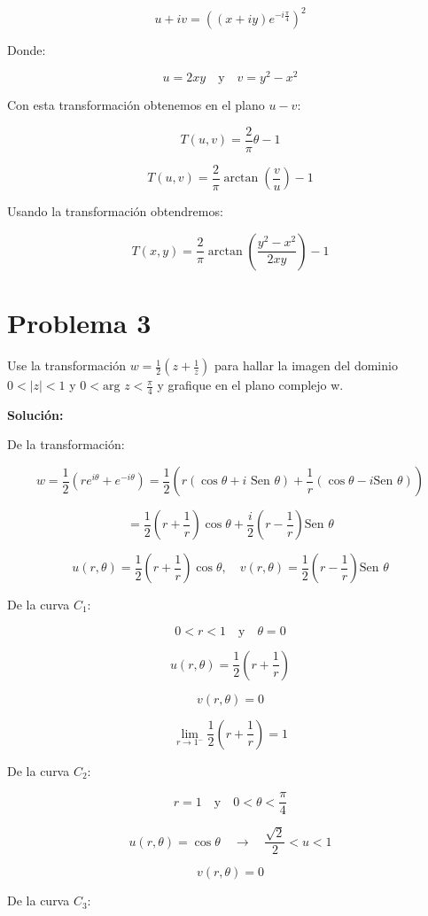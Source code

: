 \documentclass[a4paper,12pt]{article}
\begin{document}
\[
u + iv = \left( (x + iy) e^{-i\frac{\pi}{4}} \right)^{2}
\]

Donde:

\[
u = 2xy \quad \text{y} \quad v = y^{2} - x^{2}
\]

Con esta transformación obtenemos en el plano \( u-v \):

\[
T(u,v) = \frac{2}{\pi}\theta - 1
\]

\[
T(u,v) = \frac{2}{\pi}\arctan\left(\frac{v}{u}\right) - 1
\]

Usando la transformación obtendremos:

\[
T(x,y) = \frac{2}{\pi}\arctan\left(\frac{y^{2} - x^{2}}{2xy}\right) - 1
\]
\section*{Problema 3}
Use la transformación \(w = \frac{1}{2} (z + \frac{1}{z})\) para hallar la imagen del dominio \(0 < |z| < 1\) y \(0 < \text{arg } z < \frac{\pi}{4}\)
y grafique en el plano complejo w.

\textbf{Solución:}

De la transformación:

\[
w = \frac{1}{2} (re^{i\theta} + e^{-i\theta}) = \frac{1}{2} \left( r(\cos \theta + i \text{ Sen } \theta) + \frac{1}{r} (\cos \theta - i \text{Sen } \theta) \right)
\]

\[
= \frac{1}{2} \left( r + \frac{1}{r} \right) \cos \theta + \frac{i}{2} \left( r - \frac{1}{r} \right) \text{Sen } \theta
\]

\[
u(r, \theta) = \frac{1}{2} \left( r + \frac{1}{r} \right) \cos \theta, \quad v(r, \theta) = \frac{1}{2} \left( r - \frac{1}{r} \right) \text{Sen } \theta
\]

De la curva $C_1$:

\[
0 < r < 1 \quad \text{y} \quad \theta = 0
\]

\[
u(r, \theta) = \frac{1}{2} \left( r + \frac{1}{r} \right)
\]

\[
v(r, \theta) = 0
\]

\[
\lim_{r \rightarrow 1^-} \frac{1}{2} \left( r + \frac{1}{r} \right) = 1
\]

De la curva $C_2$:

\[
r = 1 \quad \text{y} \quad 0 < \theta < \frac{\pi}{4}
\]

\[
u(r, \theta) = \cos \theta \quad \rightarrow \quad \frac{\sqrt{2}}{2} < u < 1
\]

\[
v(r, \theta) = 0
\]

De la curva $C_3$:
\end{document}
